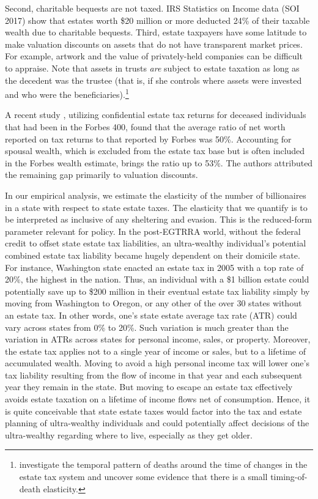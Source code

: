 \documentclass[12pt]{article}
\begin{document}
Second, charitable bequests are not taxed. IRS Statistics on Income data (SOI 2017) show that estates worth \$20 million or more deducted 24\% of their taxable wealth due to charitable bequests. 
Third, estate taxpayers have some latitude to make valuation discounts on assets that do not have transparent market prices. For example, artwork and the value of privately-held companies can be difficult to appraise. Note that assets in trusts \textit{are} subject to estate taxation as long as the decedent was the trustee (that is, if she controls where assets were invested and who were the beneficiaries).\footnote{\cite{wo2} investigate the temporal pattern of deaths around the time of changes in the estate tax system and uncover some evidence that there is a small timing-of-death elasticity.}

A recent study \citep{raub2010comparison}, utilizing confidential estate tax returns for deceased individuals that had been in the Forbes 400, found that the average ratio of net worth reported on tax returns to that reported by Forbes was 50\%. Accounting for spousal wealth, which is excluded from the estate tax base but is often included in the Forbes wealth estimate, brings the ratio up to 53\%. The authors attributed the remaining gap primarily to valuation discounts.

In our empirical analysis, we estimate the elasticity of the number of billionaires in a state with respect to state estate taxes. The elasticity that we quantify is to be interpreted as inclusive of any sheltering and evasion. This is the reduced-form parameter relevant for policy.  
In the post-EGTRRA world, without the federal credit to offset state estate tax liabilities, an ultra-wealthy individual's potential combined estate tax liability became hugely dependent on their domicile state. For instance, Washington state enacted an estate tax in 2005 with a top rate of 20\%, the highest in the nation. Thus, an individual with a \$1 billion estate could potentially save up to \$200 million in their eventual estate tax liability simply by moving from Washington to Oregon, or any other of the over 30 states without an estate tax. In other words, one's state estate average tax rate (ATR) could vary across states from 0\% to 20\%. Such variation is much greater than the variation in ATRs across states for personal income, sales, or property. Moreover, the estate tax applies not to a single year of income or sales, but to a lifetime of accumulated wealth. Moving to avoid a high personal income tax will lower one's tax liability resulting from the flow of income in that year and each subsequent year they remain in the state. But moving to escape an estate tax effectively avoids estate taxation on a lifetime of income flows net of consumption. Hence, it is quite conceivable that state estate taxes would factor into the tax and estate planning of ultra-wealthy individuals and could potentially affect decisions of the ultra-wealthy regarding where to live, especially as they get older.
\end{document}
